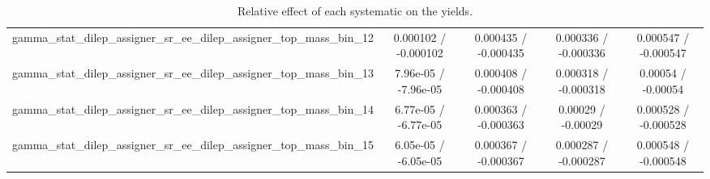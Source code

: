 \documentclass[10pt]{article}
\begin{document}
\begin{table}[htbp]
\begin{center}
\begin{tabular}{|c|c|c|c|c|}
  gamma_stat_dilep_assigner_sr_ee_dilep_assigner_top_mass_bin_12 & 0.000102 / -0.000102 & 0.000435 / -0.000435 & 0.000336 / -0.000336 & 0.000547 / -0.000547 \\ 
  gamma_stat_dilep_assigner_sr_ee_dilep_assigner_top_mass_bin_13 & 7.96e-05 / -7.96e-05 & 0.000408 / -0.000408 & 0.000318 / -0.000318 & 0.00054 / -0.00054 \\ 
  gamma_stat_dilep_assigner_sr_ee_dilep_assigner_top_mass_bin_14 & 6.77e-05 / -6.77e-05 & 0.000363 / -0.000363 & 0.00029 / -0.00029 & 0.000528 / -0.000528 \\ 
  gamma_stat_dilep_assigner_sr_ee_dilep_assigner_top_mass_bin_15 & 6.05e-05 / -6.05e-05 & 0.000367 / -0.000367 & 0.000287 / -0.000287 & 0.000548 / -0.000548 \\ 
\hline 
\end{tabular} 
\caption{Relative effect of each systematic on the yields.} 
\end{center} 
\end{table} 
\end{document}
